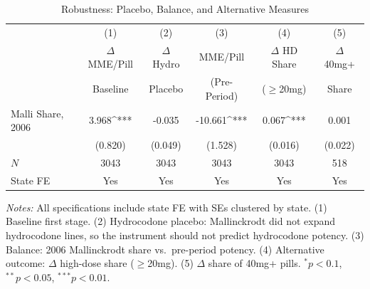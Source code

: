 \begin{table}[htbp]
\centering
\caption{Robustness: Placebo, Balance, and Alternative Measures}
\label{tab:robustness}
\begin{adjustbox}{max width=\textwidth}
\begin{tabular}{lccccc}
\hline\hline
 & (1) & (2) & (3) & (4) & (5) \\
 & $\Delta$ MME/Pill & $\Delta$ Hydro & MME/Pill & $\Delta$ HD Share & $\Delta$ 40mg+ \\
 & Baseline & Placebo & (Pre-Period) & ($\geq$20mg) & Share \\
\hline
Malli Share, 2006 & 3.968^{***} & -0.035 & -10.661^{***} & 0.067^{***} & 0.001 \\
 & (0.820) & (0.049) & (1.528) & (0.016) & (0.022) \\
\hline
$N$ & 3043 & 3043 & 3043 & 3043 & 518 \\
State FE & Yes & Yes & Yes & Yes & Yes \\
\hline\hline
\end{tabular}
\end{adjustbox}
\par\vspace{0.5em}\parbox{\textwidth}{\small \textit{Notes:} All specifications include state FE with SEs clustered by state. (1) Baseline first stage. (2) Hydrocodone placebo: Mallinckrodt did not expand hydrocodone lines, so the instrument should not predict hydrocodone potency. (3) Balance: 2006 Mallinckrodt share vs.~pre-period potency. (4) Alternative outcome: $\Delta$ high-dose share ($\geq$20mg). (5) $\Delta$ share of 40mg+ pills. $^{*}p<0.1$, $^{**}p<0.05$, $^{***}p<0.01$.
}
\end{table}
